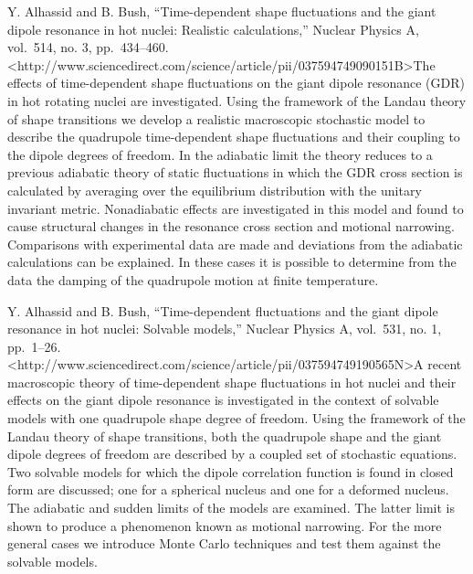 \documentclass[]{article}
\begin{document}
Y. Alhassid and B. Bush, ``Time-dependent shape fluctuations and the
giant dipole resonance in hot nuclei: Realistic calculations,'' Nuclear
Physics A, vol.~514, no. 3, pp.~434--460.
\textless{}http://www.sciencedirect.com/science/article/pii/037594749090151B\textgreater{}The
effects of time-dependent shape fluctuations on the giant dipole
resonance (GDR) in hot rotating nuclei are investigated. Using the
framework of the Landau theory of shape transitions we develop a
realistic macroscopic stochastic model to describe the quadrupole
time-dependent shape fluctuations and their coupling to the dipole
degrees of freedom. In the adiabatic limit the theory reduces to a
previous adiabatic theory of static fluctuations in which the GDR cross
section is calculated by averaging over the equilibrium distribution
with the unitary invariant metric. Nonadiabatic effects are investigated
in this model and found to cause structural changes in the resonance
cross section and motional narrowing. Comparisons with experimental data
are made and deviations from the adiabatic calculations can be
explained. In these cases it is possible to determine from the data the
damping of the quadrupole motion at finite temperature.

Y. Alhassid and B. Bush, ``Time-dependent fluctuations and the giant
dipole resonance in hot nuclei: Solvable models,'' Nuclear Physics A,
vol.~531, no. 1, pp.~1--26.
\textless{}http://www.sciencedirect.com/science/article/pii/037594749190565N\textgreater{}A
recent macroscopic theory of time-dependent shape fluctuations in hot
nuclei and their effects on the giant dipole resonance is investigated
in the context of solvable models with one quadrupole shape degree of
freedom. Using the framework of the Landau theory of shape transitions,
both the quadrupole shape and the giant dipole degrees of freedom are
described by a coupled set of stochastic equations. Two solvable models
for which the dipole correlation function is found in closed form are
discussed; one for a spherical nucleus and one for a deformed nucleus.
The adiabatic and sudden limits of the models are examined. The latter
limit is shown to produce a phenomenon known as motional narrowing. For
the more general cases we introduce Monte Carlo techniques and test them
against the solvable models.
\end{document}
